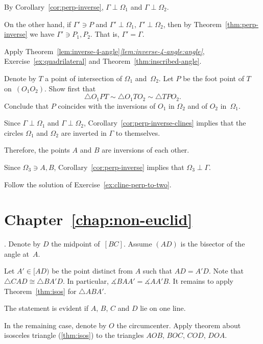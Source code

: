 By Corollary~\ref{cor:perp-inverse},
$\Gamma\perp\Omega_1$ and $\Gamma\perp\Omega_2$.

On the other hand, if $\Gamma'\ni P$ 
and $\Gamma'\perp\Omega_1$, $\Gamma'\perp\Omega_2$, then by Theorem~\ref{thm:perp-inverse} we have $\Gamma'\ni P_1,P_2$.
That is, $\Gamma'=\Gamma$.

Apply Theorem~\ref{lem:inverse-4-angle}\textit{\ref{lem:inverse-4-angle:angle}},  
Exercise~\ref{ex:quadrilateral}
and Theorem~\ref{thm:inscribed-angle}.

Denote by $T$ 
a point of intersection of $\Omega_1$ and~$\Omega_2$.
Let $P$ be the foot point of $T$ on~$(O_1O_2)$.
Show first that
$$\triangle O_1PT
\sim \triangle O_1TO_2
\sim \triangle TPO_2.$$
Conclude that $P$ coincides with the inversions of $O_1$ in $\Omega_2$ and of $O_2$ in~$\Omega_1$.

Since $\Gamma\perp\Omega_1$ and $\Gamma\perp\Omega_2$,
Corollary~\ref{cor:perp-inverse-clines} 
implies that
the circles $\Omega_1$ and $\Omega_2$ are inverted in $\Gamma$ 
to themselves.

Therefore, the points $A$ and $B$ are inversions of each other.

Since $\Omega_3\ni A,B$,
Corollary~\ref{cor:perp-inverse} implies that
$\Omega_3\perp \Gamma$.

Follow the solution of Exercise~\ref{ex:cline-perp-to-two}.

\section*{Chapter~\ref{chap:non-euclid}}
\setcounter{eqtn}{0}

.
Denote by $D$ the midpoint of~$[BC]$.
Assume $(AD)$ is the bisector of the angle at~$A$.

Let $A'\in [AD)$ be the point distinct from $A$ such that $AD=A'D$.
Note that $\triangle CAD\cong\triangle BA'D$.
In particular, $\measuredangle BAA'=\measuredangle AA'B$.
It remains to apply Theorem~\ref{thm:isos} for $\triangle ABA'$.

The statement is evident if $A$, $B$, $C$ and $D$ lie on one line.

In the remaining case, denote by $O$ the circumcenter.
Apply theorem about isosceles triangle (\ref{thm:isos}) to the triangles 
$AOB$,
$BOC$, 
$COD$, 
$DOA$. 

